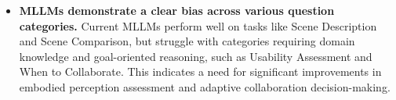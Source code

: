 \documentclass[letterpaper]{article} %
\begin{document}
\begin{itemize}[left=0pt]
    \item \textbf{MLLMs demonstrate a clear bias across various question categories.}
    Current MLLMs perform well on tasks like Scene Description and Scene Comparison, but struggle with categories requiring domain knowledge and goal-oriented reasoning, such as Usability Assessment and When to Collaborate. This indicates a need for significant improvements in embodied perception assessment and adaptive collaboration decision-making.
\end{itemize}

\end{document}
